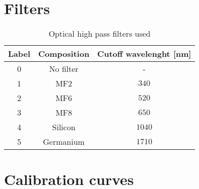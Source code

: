 \section{Filters}
\label{sec:filters}

\begin{table}[htbp]
    \centering
    \begin{tabular}{c c c}
        Label & Composition & Cutoff wavelenght [nm] \\
        \hline
        0 & No filter & - \\
        1 & MF2 & $340$ \\
        2 & MF6 & $520$ \\
        3 & MF8 & $650$ \\
        4 & Silicon & $1040$ \\
        5 & Germanium & $1710$
    \end{tabular}
    \caption{Optical high pass filters used}
    \label{tab:filters}
\end{table}

\section{Calibration curves}
\label{sec:calibration_curves}